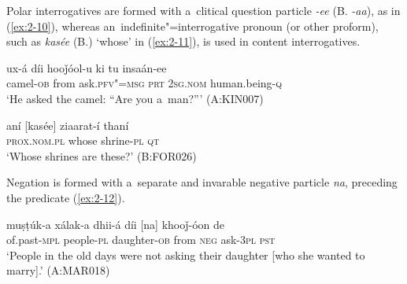 Polar interrogatives are formed with a~clitical question particle \textit{-ee} (B. \textit{-aa}), as in (\ref{ex:2-10}), whereas an~indefinite"=interrogative pronoun (or other proform), such as \textit{kasée} (B.) `whose' in (\ref{ex:2-11}), is used in content interrogatives. 

\begin{exe}
\ex
\label{ex:2-10}
\gll ux-á díi hooǰóol-u ki tu insaán-ee \\
	camel-\textsc{ob} from ask.\textsc{pfv"=msg} \textsc{prt} \textsc{2sg.nom} human.being-\textsc{q} \\
\glt `He asked the camel: ``Are you a~man?''' (A:KIN007)
\end{exe}


\begin{exe}
\ex
\label{ex:2-11}
\gll aní [kasée] ziaarat-í thaní \\
	\textsc{prox.nom.pl} whose shrine-\textsc{pl} \textsc{qt} \\
\glt `Whose shrines are these?' (B:FOR026)
\end{exe}

Negation is formed with a~separate and invarable negative particle \textit{na}, preceding the predicate (\ref{ex:2-12}).

\begin{exe}
\ex
\label{ex:2-12}
\gll muṣṭúk-a xálak-a dhii-á díi [na] khooǰ-óon de \\
	of.past-\textsc{mpl} people-\textsc{pl} daughter-\textsc{ob} from \textsc{neg} ask-\textsc{3pl} \textsc{pst} \\
\glt `People in the old days were not asking their daughter [who she wanted to marry].' (A:MAR018)
\end{exe}